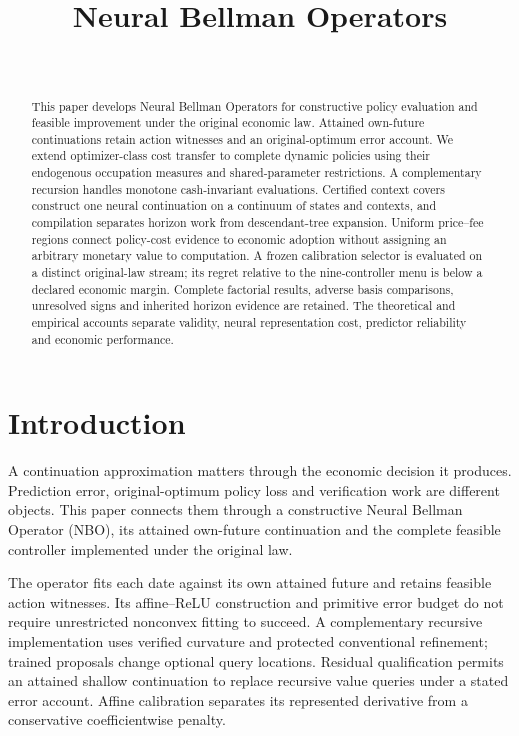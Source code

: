 \documentclass[ecta,nameyear,draft]{econsocart}
\begin{document}
\begin{frontmatter}
\title{Neural Bellman Operators}
\begin{aug}
\author[id=au1,addressref={add1}]{~}
\address[id=add1]{Peking University}
\end{aug}
\begin{abstract}
This paper develops Neural Bellman Operators for constructive policy evaluation and feasible improvement under the original economic law. Attained own-future continuations retain action witnesses and an original-optimum error account. We extend optimizer-class cost transfer to complete dynamic policies using their endogenous occupation measures and shared-parameter restrictions. A complementary recursion handles monotone cash-invariant evaluations. Certified context covers construct one neural continuation on a continuum of states and contexts, and compilation separates horizon work from descendant-tree expansion. Uniform price--fee regions connect policy-cost evidence to economic adoption without assigning an arbitrary monetary value to computation. A frozen calibration selector is evaluated on a distinct original-law stream; its regret relative to the nine-controller menu is below a declared economic margin. Complete factorial results, adverse basis comparisons, unresolved signs and inherited horizon evidence are retained. The theoretical and empirical accounts separate validity, neural representation cost, predictor reliability and economic performance.
\end{abstract}
\begin{keyword}
\end{keyword}
\end{frontmatter}
\section{Introduction}\label{sec:introduction65}
A continuation approximation matters through the economic decision it produces. Prediction error, original-optimum policy loss and verification work are different objects. This paper connects them through a constructive Neural Bellman Operator (NBO), its attained own-future continuation and the complete feasible controller implemented under the original law.

The operator fits each date against its own attained future and retains feasible action witnesses. Its affine--ReLU construction and primitive error budget do not require unrestricted nonconvex fitting to succeed. A complementary recursive implementation uses verified curvature and protected conventional refinement; trained proposals change optional query locations. Residual qualification permits an attained shallow continuation to replace recursive value queries under a stated error account. Affine calibration separates its represented derivative from a conservative coefficientwise penalty.
\end{document}
